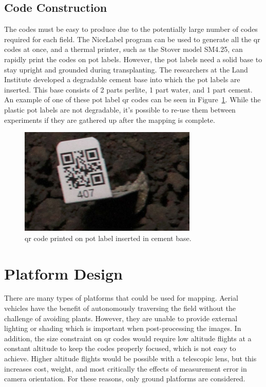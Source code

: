 \subsection{Code Construction}

The codes must be easy to produce due to the potentially large number of codes required for each field.  The NiceLabel program can be used to generate all the \ac{qr} codes at once, and a thermal printer, such as the Stover model SM4.25, can rapidly print the codes on pot labels.  However, the pot labels need a solid base to stay upright and grounded during transplanting. The researchers at the Land Institute developed a degradable cement base into which the pot labels are inserted.  This base consists of 2 parts perlite, 1 part water, and 1 part cement.  An example of one of these pot label \ac{qr} codes can be seen in Figure~\ref{QR_code}.  While the plastic pot labels are not degradable, it's possible to re-use them between experiments if they are gathered up after the mapping is complete.

\begin{figure}
	\centering
    \includegraphics[height=2in]{figures/qr_code_407.jpg}
    \caption[Pot label QR code]{\ac{qr} code printed on pot label inserted in cement base.}
    \label{QR_code}
\end{figure}

\section{Platform Design}
\label{section:platform_design}

There are many types of platforms that could be used for mapping.  Aerial vehicles have the benefit of autonomously traversing the field without the challenge of avoiding plants. However, they are unable to provide external lighting or shading which is important when post-processing the images. In addition, the size constraint on \ac{qr} codes would require low altitude flights at a constant altitude to keep the codes properly focused, which is not easy to achieve.  Higher altitude flights would be possible with a telescopic lens, but this increases cost, weight, and most critically the effects of measurement error in camera orientation.  For these reasons, only ground platforms are considered.

